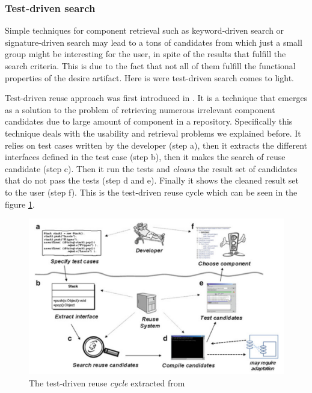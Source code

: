 \subsubsection{Test-driven search}
Simple techniques for component retrieval such as keyword-driven search or signature-driven search may lead to a tons of candidates from which just a small group might be interesting for the user, in spite of the results that fulfill the search criteria. This is due to the fact that not all of them fulfill the functional properties of the desire artifact. Here is were test-driven search comes to light. 

Test-driven reuse approach was first introduced in \cite{Hummel2004}. It is a technique that emerges as a solution to the problem of retrieving numerous irrelevant component candidates due to large amount of component in a repository. Specifically this technique deals with the usability and retrieval problems we explained before. It relies on test cases written by the developer (step a), then it extracts the different interfaces defined in the test case (step b), then it makes the search of reuse candidate (step c). Then it run the tests and \textit{cleans} the result set of candidates that do not pass the tests (step d and e). Finally it shows the cleaned result set to the user (step f). This is the test-driven reuse cycle which can be seen in the figure \ref{fig:test-driven-cycle}.

\begin{figure}[ht]
	\centering
    \includegraphics[width=\textwidth]{grafiken/test-driven-cycle}
    \caption{The test-driven reuse \textit{cycle} extracted from \cite{Hummel2013}}
    \label{fig:test-driven-cycle}
\end{figure}

